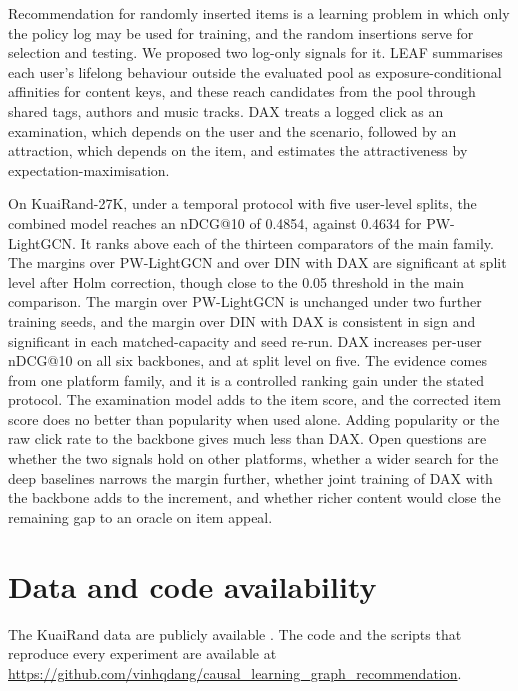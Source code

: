 \documentclass[preprint,12pt,authoryear]{elsarticle}
\begin{document}
Recommendation for randomly inserted items is a learning problem in which only the policy log may be used for training, and the random insertions
serve for selection and testing. We proposed two log-only signals for it. LEAF summarises each user's lifelong behaviour outside the evaluated pool as
exposure-conditional affinities for content keys, and these reach candidates from the pool through shared tags, authors and music tracks. DAX treats
a logged click as an examination, which depends on the user and the scenario, followed by an attraction, which depends on the item, and estimates the
attractiveness by expectation-maximisation.

On KuaiRand-27K, under a temporal protocol with five user-level splits, the combined model reaches an nDCG@10 of 0.4854, against 0.4634 for PW-LightGCN.
It ranks above each of the thirteen comparators of the main family. The margins over PW-LightGCN and over DIN with DAX are significant at split level after Holm correction, though close to the 0.05 threshold in the main comparison. The margin over PW-LightGCN is unchanged under two further training seeds, and the margin over DIN with DAX is consistent in sign and significant in each matched-capacity and seed re-run. DAX increases per-user nDCG@10 on all six backbones, and at split level on five. The evidence comes
from one platform family, and it is a controlled ranking gain under the stated protocol. The examination model adds to the item score, and the corrected
item score does no better than popularity when used alone. Adding popularity or the raw click rate to the backbone gives much less than DAX. Open questions are whether the two signals hold on other platforms, whether a wider
search for the deep baselines narrows the margin further, whether joint training of DAX with the backbone adds to the increment, and whether
richer content would close the remaining gap to an oracle on item appeal.

\section*{Data and code availability}
The KuaiRand data are publicly available \citep{gao2022kuairand}. The code and the scripts that reproduce every experiment are available at \url{https://github.com/vinhqdang/causal_learning_graph_recommendation}.
\end{document}
